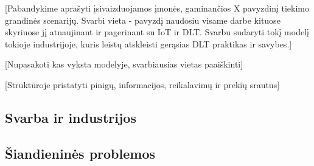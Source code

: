 [Pabandykime aprašyti įsivaizduojamos įmonės, gaminančios X pavyzdinį tiekimo grandinės scenarijų. Svarbi vieta - pavyzdį naudosiu visame darbe kituose skyriuose jį atnaujinant ir pagerinant su IoT ir DLT. Svarbu sudaryti tokį modelį tokioje industrijoje, kuris leistų atskleisti gerąsias DLT praktikas ir savybes.] 

[Nupasakoti kas vyksta modelyje, svarbiausias vietas paaiškinti]

[Struktūroje pristatyti pinigų, informacijos, reikalavimų ir prekių srautus]




\subsection{Svarba ir industrijos}




\subsection{Šiandieninės problemos}